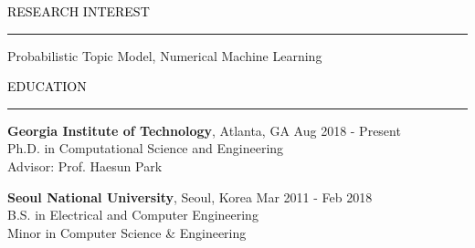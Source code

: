 \documentclass{resume} %
\renewenvironment{rSection}[1]{
	\sectionskip
	\textcolor{Black}{\MakeUppercase{#1}}
	\sectionlineskip
	\hrule
	\begin{list}{}{
			\setlength{\leftmargin}{1.5em}
		}
		\item[]
	}{
	\end{list}
}
\begin{document}
	
	
	\begin{rSection}{Research Interest}
		Probabilistic Topic Model, Numerical Machine Learning\hfill
		\vspace{-2mm}
	\end{rSection}
	
	
	\vspace*{-2.0mm}
	\begin{rSection}{Education}
		\vspace{-1mm}		
		{\bf Georgia Institute of Technology}, Atlanta, GA \hfill { Aug 2018 - Present} 
		\\ Ph.D. in Computational Science and Engineering  
		\\ Advisor: Prof. Haesun Park\hfill
		
		\vspace*{-2.5mm}
		{\bf Seoul National University}, Seoul, Korea \hfill { Mar 2011 - Feb 2018} 
		\\ B.S. in Electrical and Computer Engineering \hfill
		\\ Minor in Computer Science \& Engineering \hfill
				
	\end{rSection}
\vspace*{-2.5mm}

\end{document}
